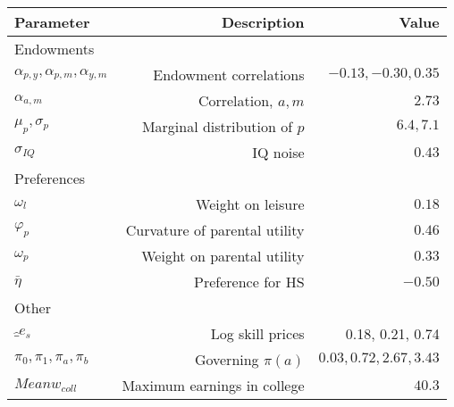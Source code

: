 \begin{tabular}{lrr}
\hline
Parameter & Description  & Value  \\
\hline
Endowments &   &   \\
$\alpha_{p,y}, \alpha_{p,m}, \alpha_{y,m}$ & Endowment correlations  & $-0.13, -0.30, 0.35$  \\
$\alpha_{a,m}$ & Correlation, $a,m$  & $2.73$  \\
$\mu_{p}, \sigma_{p}$ & Marginal distribution of $p$  & $6.4, 7.1$  \\
$\sigma_{IQ}$ & IQ noise  & $0.43$  \\
Preferences &   &   \\
$\omega_{l}$ & Weight on leisure  & $0.18$  \\
$\varphi_{p}$ & Curvature of parental utility  & $0.46$  \\
$\omega_{p}$ & Weight on parental utility  & $0.33$  \\
$\bar{\eta}$ & Preference for HS  & $-0.50$  \\
Other &   &   \\
$\hat_{e}_{s}$ & Log skill prices  & 0.18, 0.21, 0.74  \\
$\pi_{0}, \pi_{1}, \pi_{a}, \pi_{b}$ & Governing $\pi(a)$  & $0.03, 0.72, 2.67, 3.43$  \\
$Mean w_{coll}$ & Maximum earnings in college  & $40.3$  \\
\hline
\end{tabular}%
